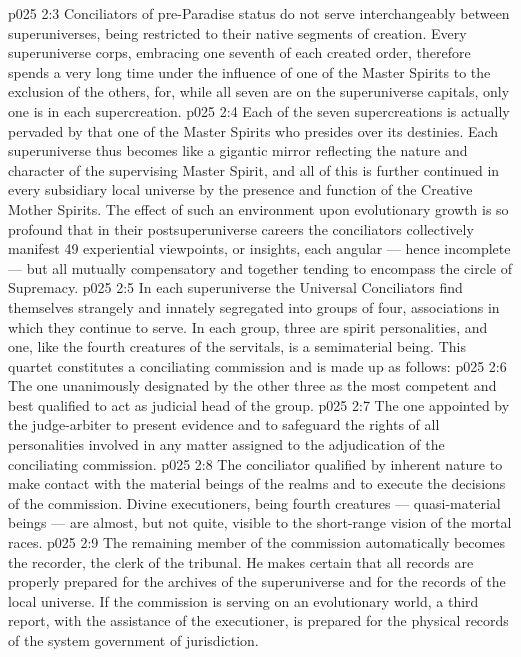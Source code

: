 \vs p025 2:3 Conciliators of pre\hyp{}Paradise status do not serve interchangeably between superuniverses, being restricted to their native segments of creation. Every superuniverse corps, embracing one seventh of each created order, therefore spends a very long time under the influence of one of the Master Spirits to the exclusion of the others, for, while all seven are  on the superuniverse capitals, only one is  in each supercreation.
\vs p025 2:4 Each of the seven supercreations is actually pervaded by that one of the Master Spirits who presides over its destinies. Each superuniverse thus becomes like a gigantic mirror reflecting the nature and character of the supervising Master Spirit, and all of this is further continued in every subsidiary local universe by the presence and function of the Creative Mother Spirits. The effect of such an environment upon evolutionary growth is so profound that in their postsuperuniverse careers the conciliators collectively manifest 49 experiential viewpoints, or insights, each angular --- hence incomplete --- but all mutually compensatory and together tending to encompass the circle of Supremacy.
\vs p025 2:5 \pc In each superuniverse the Universal Conciliators find themselves strangely and innately segregated into groups of four, associations in which they continue to serve. In each group, three are spirit personalities, and one, like the fourth creatures of the servitals, is a semimaterial being. This quartet constitutes a conciliating commission and is made up as follows:
\vs p025 2:6 \bibnobreakspace {} The one unanimously designated by the other three as the most competent and best qualified to act as judicial head of the group.
\vs p025 2:7 \bibnobreakspace {} The one appointed by the judge\hyp{}arbiter to present evidence and to safeguard the rights of all personalities involved in any matter assigned to the adjudication of the conciliating commission.
\vs p025 2:8 \bibnobreakspace {} The conciliator qualified by inherent nature to make contact with the material beings of the realms and to execute the decisions of the commission. Divine executioners, being fourth creatures --- quasi\hyp{}material beings --- are almost, but not quite, visible to the short\hyp{}range vision of the mortal races.
\vs p025 2:9 \bibnobreakspace {} The remaining member of the commission automatically becomes the recorder, the clerk of the tribunal. He makes certain that all records are properly prepared for the archives of the superuniverse and for the records of the local universe. If the commission is serving on an evolutionary world, a third report, with the assistance of the executioner, is prepared for the physical records of the system government of jurisdiction.
